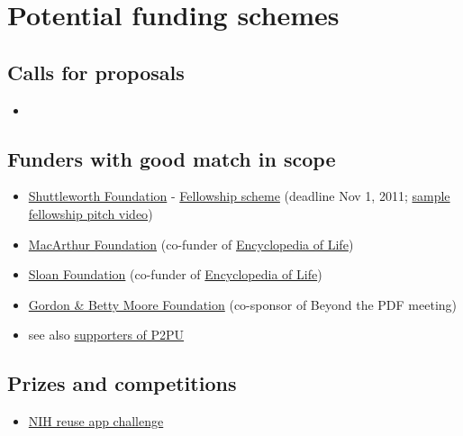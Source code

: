 \documentclass[final,authoryear,3p]{elsarticle-open-drafting}
\begin{document}
\section{Potential funding schemes}
\subsection{Calls for proposals}
\begin{itemize}
	\item 
\end{itemize}
\subsection{Funders with good match in scope}
\begin{itemize}
	\item \href{http://www.shuttleworthfoundation.org/}{Shuttleworth Foundation} - \href{http://www.shuttleworthfoundation.org/funding/fellowship-programme/}{Fellowship scheme} (deadline Nov 1, 2011; \href{http://vimeo.com/10401282}{sample fellowship pitch video})
	\item \href{http://www.macfound.org}{MacArthur Foundation} (co-funder of \href{http://www.eol.org/}{Encyclopedia of Life})
	\item \href{http://www.sloan.org/}{Sloan Foundation} (co-funder of \href{http://www.eol.org/}{Encyclopedia of Life})
	\item \href{http://www.moore.org/}{Gordon \& Betty Moore Foundation} (co-sponsor of Beyond the PDF meeting)
	\item see also \href{http://p2pu.org/general/supporters}{supporters of P2PU}
\end{itemize}
\subsection{Prizes and competitions}
\begin{itemize}
	\item \href{http://challenge.gov/NIH/132-nlm-show-off-your-apps-innovative-uses-of-nlm-information}{NIH reuse app challenge}
\end{itemize}
\end{document}
